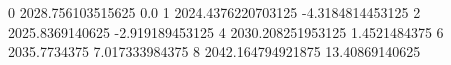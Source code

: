 0 2028.756103515625 0.0
1 2024.4376220703125 -4.3184814453125
2 2025.8369140625 -2.919189453125
4 2030.208251953125 1.4521484375
6 2035.7734375 7.017333984375
8 2042.164794921875 13.40869140625
